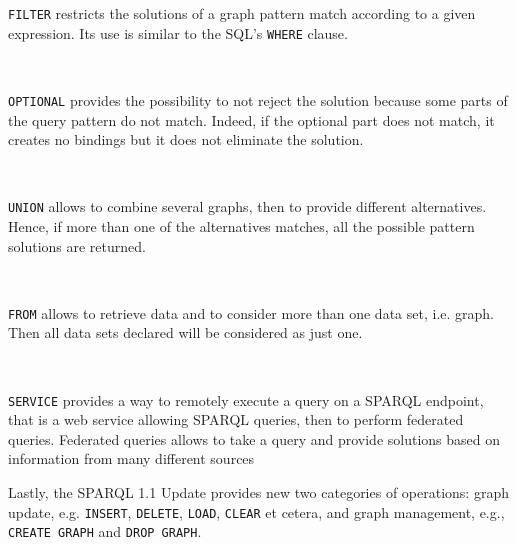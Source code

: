 \documentclass[10pt, a4paper]{report}
\begin{document}
\begin{itemize}
	\begin{minipage}{0.92\textwidth}
		\item \texttt{FILTER} restricts the solutions of a graph pattern match according to a given expression. Its use is similar to the SQL's \texttt{WHERE} clause. \\
	\end{minipage} \\

	\begin{minipage}{0.92\textwidth}
		\item \texttt{OPTIONAL} provides the possibility to not reject the solution because some parts of the query pattern do not match. Indeed, if the optional part does not match, it creates no bindings but it does not eliminate the solution. \\
	\end{minipage} \\
	\begin{minipage}{0.92\textwidth}
		\item \texttt{UNION} allows to combine several graphs, then to provide different alternatives. Hence, if more than one of the alternatives matches, all the possible pattern solutions are returned. \\
	\end{minipage} \\
	\begin{minipage}{0.92\textwidth}
		\item \texttt{FROM} allows to retrieve data and to consider more than one data set, i.e. graph. Then all data sets declared will be considered as just one. \\
	\end{minipage} \\
	\begin{minipage}{0.92\textwidth}
		\item \texttt{SERVICE} provides a way to remotely execute a query on a SPARQL endpoint, that is a web service allowing SPARQL queries, then to perform federated queries. Federated queries allows to take a query and provide solutions based on information from many different sources \\
	\end{minipage}
\end{itemize}

Lastly, the SPARQL 1.1 Update provides new two categories of operations: graph update, e.g. \texttt{INSERT}, \texttt{DELETE}, \texttt{LOAD}, \texttt{CLEAR} et cetera, and graph management, e.g., \texttt{CREATE GRAPH} and \texttt{DROP GRAPH}.
\end{document}
